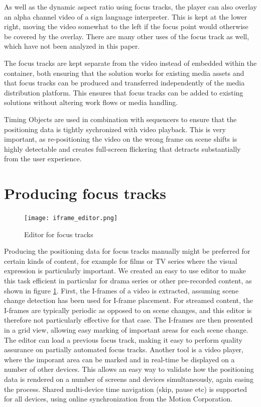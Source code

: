 \documentclass[sigconf, review=false]{acmart}
\begin{document}
As well as the dynamic aspect ratio using focus tracks, the player can also
overlay an alpha channel video of a sign language interpreter. This is kept
at the lower right, moving the video somewhat to the left if the focus point
would otherwise be covered by the overlay. There are many other uses of the
focus track as well, which have not been analyzed in this paper.

The focus tracks are kept separate from the video instead of embedded within
the container, both ensuring that the solution works for existing media
assets and that focus tracks can be produced and transferred independently of
the media distribution platform. This ensures that focus tracks can be added
to existing solutions without altering work flows or media handling.

Timing Objects \cite{Arntzen2018,timingobject} are used in combination with
sequencers \cite{sequencer} to ensure that the positioning data is tightly
sychronized with video playback. This is very important, as re-positioning
the video on the wrong frame on scene shifts is highly detectable and creates
full-screen flickering that detracts substantially from the user experience.


\section{Producing focus tracks}

\begin{figure}
\begin{center}
\texttt{[image: iframe\_editor.png]}
\caption{Editor for focus tracks}
\label{iframe_editor}
\end{center}
\end{figure}

Producing the positioning data for focus tracks manually might be preferred
for certain kinds of content, for example for films or TV series where the
visual expression is particularly important. We created an easy to use editor
to make this task efficient in particular for drama series or other
pre-recorded content, as shown in figure \ref{iframe_editor}. First, the
I-frames of a video is extracted, assuming scene change detection has been
used for I-frame placement. For streamed content, the I-frames are typically
periodic as opposed to on scene changes, and this editor is therefore not
particularly effective for that case. The I-frames are then presented in a
grid view, allowing easy marking of important areas for each scene change.
The editor can load a previous focus track, making it easy to perform quality
assurance on partially automated focus tracks. Another tool is a video
player, where the imporant area can be marked and in real-time be displayed
on a number of other devices. This allows an easy way to validate how the
positioning data is rendered on a number of screens and devices
simultaneously, again easing the process. Shared multi-device time navigation
(skip, pause etc) is supported for all devices, using online synchronization
from the Motion Corporation\cite{inMotion}.
\end{document}
